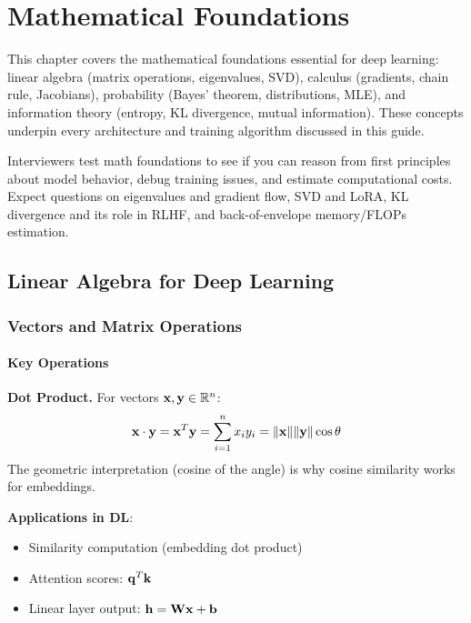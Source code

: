 \chapter{Mathematical Foundations}
\label{chap:mathematical_foundations}

\begin{tldr}
This chapter covers the mathematical foundations essential for deep learning: linear algebra (matrix operations, eigenvalues, SVD), calculus (gradients, chain rule, Jacobians), probability (Bayes' theorem, distributions, MLE), and information theory (entropy, KL divergence, mutual information). These concepts underpin every architecture and training algorithm discussed in this guide.
\end{tldr}

Interviewers test math foundations to see if you can reason from first principles about model behavior, debug training issues, and estimate computational costs. Expect questions on eigenvalues and gradient flow, SVD and LoRA, KL divergence and its role in RLHF, and back-of-envelope memory/FLOPs estimation.

\section{Linear Algebra for Deep Learning}
\label{sec:linear_algebra}

\subsection{Vectors and Matrix Operations}

\subsubsection{Key Operations}

\textbf{Dot Product.} For vectors $\mathbf{x}, \mathbf{y} \in \mathbb{R}^n$:
\begin{equation}
\mathbf{x} \cdot \mathbf{y} = \mathbf{x}^T \mathbf{y} = \sum_{i=1}^n x_i y_i = \|\mathbf{x}\| \|\mathbf{y}\| \cos\theta
\end{equation}
The geometric interpretation (cosine of the angle) is why cosine similarity works for embeddings.

\textbf{Applications in DL}:
\begin{itemize}
    \item Similarity computation (embedding dot product)
    \item Attention scores: $\mathbf{q}^T \mathbf{k}$
    \item Linear layer output: $\mathbf{h} = \mathbf{W} \mathbf{x} + \mathbf{b}$
\end{itemize}

